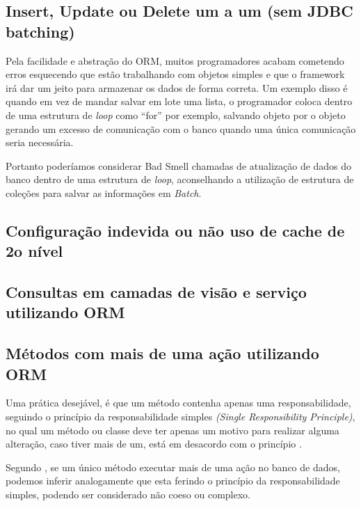 \subsection{Insert, Update ou Delete um a um (sem JDBC batching)}

Pela facilidade e abstração do ORM, muitos programadores acabam cometendo erros esquecendo  que estão trabalhando com objetos simples e que o framework irá dar um jeito para armazenar os dados de forma correta. Um exemplo disso é quando em vez de mandar salvar em lote uma lista, o programador coloca dentro de uma estrutura de \textit{loop} como “for” por exemplo, salvando objeto por o objeto gerando um excesso de comunicação com o banco quando uma única comunicação seria necessária.

Portanto poderíamos considerar Bad Smell chamadas de atualização de dados do banco dentro de uma estrutura de \textit{loop}, aconselhando a utilização de estrutura de coleções para salvar as informações em \textit{Batch}.



\subsection{Configuração indevida ou não uso de cache de 2o nível}


\subsection{Consultas em camadas de visão e serviço utilizando ORM}



\subsection{Métodos com mais de uma ação utilizando ORM}

Uma prática desejável, é que um método contenha apenas uma responsabilidade, seguindo o princípio da responsabilidade simples \textit{(Single Responsibility Principle)}, no qual um método ou classe deve ter apenas um motivo para realizar alguma alteração, caso tiver mais de um, está em desacordo com o princípio \citep{Martin:2008:CCH:1388398}. 

Segundo \cite{Aniche2018}, se um único método executar mais de uma ação no banco de dados, podemos inferir analogamente que esta ferindo o princípio da responsabilidade simples, podendo ser considerado não coeso ou complexo.

